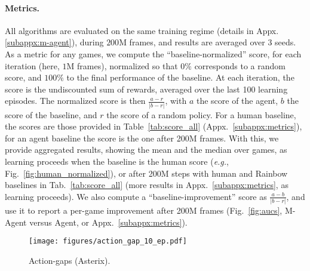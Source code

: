 \documentclass{article}
\begin{document}
\paragraph{Metrics.}
All algorithms are evaluated on the same training regime (details in Appx.\ref{subappx:m-agent}), during $200$M frames, and results are averaged over $3$ seeds. As a metric for any games, we compute the ``baseline-normalized'' score, for each iteration (here, $1$M frames), normalized so that $0\%$ corresponds to a random score, and $100\%$ to the final performance of the baseline. At each iteration, the score is the undiscounted sum of rewards, averaged over the last 100 learning episodes. The normalized score is then $\frac{a - r}{|b - r|}$, with $a$ the score of the agent, $b$ the score of the baseline, and $r$ the score of a random policy. For a human baseline, the scores are those provided in Table~\ref{tab:score_all} (Appx.~\ref{subappx:metrics}), for an agent baseline the score is the one after 200M frames. With this, we provide aggregated results, showing the mean and the median over games, as learning proceeds when the baseline is the human score (\textit{e.g.}, Fig.~\ref{fig:human_normalized}), or after 200M steps with human and Rainbow baselines in Tab.~\ref{tab:score_all} (more results in Appx.~\ref{subappx:metrics}, as learning proceeds). We also compute a ``baseline-improvement'' score as $\frac{a - b}{|b - r|}$, and use it to report a per-game improvement after 200M frames (Fig.~\ref{fig:aucs}, M-Agent versus Agent, or Appx.~\ref{subappx:metrics}).


\begin{wrapfigure}{r}{0.41\textwidth}
\vspace{-25pt}
    \centering
    \texttt{[image: figures/action\_gap\_10\_ep.pdf]}
    \caption{Action-gaps (Asterix).}
    \label{fig:action_gap}
\end{wrapfigure}
\end{document}
